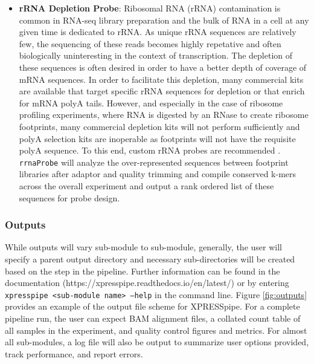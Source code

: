 \documentclass[11pt, a4paper, oneside]{article}
\begin{document}
\begin{enumerate}
\begin{itemize}
      \item \textbf{rRNA Depletion Probe}: Ribosomal RNA (rRNA) contamination is common in RNA-seq library preparation and the bulk of RNA in a cell at any given time is dedicated to rRNA. As unique rRNA sequences are relatively few, the sequencing of these reads becomes highly repetative and often biologically uninteresting in the context of transcription. The depletion of these sequences is often desired in order to have a better depth of coverage of mRNA sequences. In order to facilitate this depletion, many commercial kits are available that target specific rRNA sequences for depletion or that enrich for mRNA polyA tails. However, and especially in the case of ribosome profiling experiments, where RNA is digested by an RNase to create ribosome footprints, many commercial depletion kits will not perform sufficiently and polyA selection kits are inoperable as footprints will not have the requisite polyA sequence. To this end, custom rRNA probes are recommended \cite{ingolia_meth, ingolia_science}. \texttt{rrnaProbe} will analyze the over-represented sequences between footprint libraries after adaptor and quality trimming and compile conserved k-mers across the overall experiment and output a rank ordered list of these sequences for probe design.

    \end{itemize}
\end{enumerate}


\subsubsection{Outputs}
While outputs will vary sub-module to sub-module, generally, the user will specify a parent output directory and necessary sub-directories will be created based on the step in the pipeline. Further information can be found in the documentation (https://xpresspipe.readthedocs.io/en/latest/) or by entering \texttt{xpresspipe \textless sub-module name\textgreater \ --help} in the command line. Figure \ref{fig:outputs} provides an example of the output file scheme for XPRESSpipe. For a complete pipeline run, the user can expect BAM alignment files, a collated count table of all samples in the experiment, and quality control figures and metrics. For almost all sub-modules, a log file will also be output to summarize user options provided, track performance, and report errors.
\end{document}
